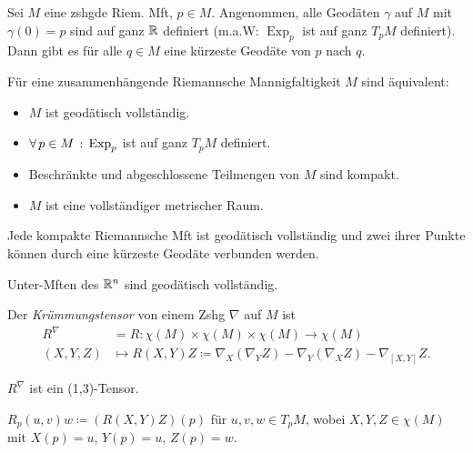 \documentclass{cheat-sheet}
\DeclareMathOperator{\Exp}{Exp} %
\begin{document}

\begin{satz}
  Sei $M$ eine zshgde Riem. Mft, $p \in M$. Angenommen, alle Geodäten $\gamma$ auf $M$ mit $\gamma(0) = p$ sind auf ganz $\mathbb{R}$ definiert (m.a.W: $\Exp_p$ ist auf ganz $T_p M$ definiert). Dann gibt es für alle $q \in M$ eine kürzeste Geodäte von $p$ nach $q$.
\end{satz}

\begin{satz}
  Für eine zusammenhängende Riemannsche Mannigfaltigkeit $M$ sind äquivalent:
  \begin{itemize}
    \item $M$ ist geodätisch vollständig.
    \item $\fa{p \in M} \Exp_p$ ist auf ganz $T_p M$ definiert.
    \item Beschränkte und abgeschlossene Teilmengen von $M$ sind kompakt.
    \item $M$ ist eine vollständiger metrischer Raum.
  \end{itemize}
\end{satz}

\begin{kor}
  Jede kompakte Riemannsche Mft ist geodätisch vollständig und zwei ihrer Punkte können durch eine kürzeste Geodäte verbunden werden.
\end{kor}

\begin{kor}
  Unter-Mften des $\mathbb{R}^n$ sind geodätisch vollständig.
\end{kor}


\begin{defn}
  Der \emph{Krümmungstensor} von einem Zshg $\nabla$ auf $M$ ist
  \begin{align*}
    R^{\nabla} & = R : \chi(M) \times \chi(M) \times \chi(M) \to \chi(M) \\
    (X, Y, Z) & \mapsto R(X, Y)Z \coloneqq \nabla_X (\nabla_Y Z) - \nabla_Y (\nabla_X Z) - \nabla_{[X, Y]} Z.
  \end{align*}
\end{defn}

\begin{bem}
  $R^\nabla$ ist ein (1,3)-Tensor.
\end{bem}

\begin{nota}
  $R_p(u, v)w \coloneqq (R(X, Y)Z)(p)$ für $u, v, w \in T_p M$, wobei $X, Y, Z \in \chi(M)$ mit $X(p) \!=\! u$, $Y(p) \!=\! u$, $Z(p) \!=\! w$.
\end{nota}
\end{document}
